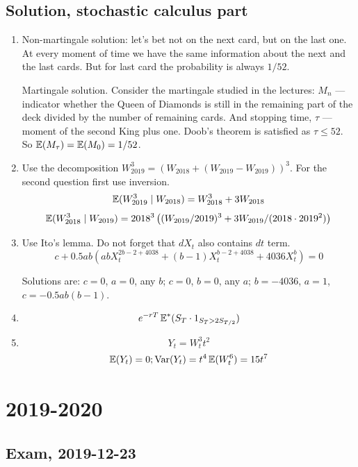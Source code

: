 \documentclass[12pt, a4paper]{article}
\begin{document}
\subsection{Solution, stochastic calculus part}

\begin{enumerate}
\item Non-martingale solution: let's bet not on the next card, but on the last one.
At every moment of time we have the same information about
the next and the last cards. But for last card the probability is always $1/52$.

Martingale solution. Consider the martingale studied in the lectures:
$M_n$ — indicator whether the Queen of Diamonds is still
in the remaining part of the deck divided
by the number of remaining cards.
And stopping time, $\tau$ — moment of the second King plus one.
Doob's theorem is satisfied as $\tau \leq 52$. So $\operatorname{\mathbb{E}}(M_{\tau}) = \operatorname{\mathbb{E}}(M_0)=1/52$.
\item Use the decomposition $W_{2019}^3= (W_{2018} + (W_{2019} - W_{2019}))^3$.
For the second question first use inversion.
\[
\operatorname{\mathbb{E}}(W_{2019}^3 \mid W_{2018}) = W_{2018}^3 + 3W_{2018}
\]
\[
\operatorname{\mathbb{E}}(W_{2018}^3 \mid W_{2019}) = 2018^3 \left( (W_{2019}/2019)^3 + 3 W_{2019}/(2018\cdot 2019^2) \right)
\]

\item Use Ito's lemma. Do not forget that $dX_t$ also contains $dt$ term.
\[
c + 0.5ab(ab X_t^{2b-2+4038} + (b-1)X_t^{b-2+4038} + 4036X_t^b) = 0
\]

Solutions are: $c=0$, $a=0$, any $b$; $c=0$, $b=0$, any $a$; $b=-4036$, $a=1$, $c=-0.5ab(b-1)$.
\item
\[
e^{-rT}\operatorname{\mathbb{E}}^*(S_T \cdot 1_{S_T > 2S_{T/2}})
\]
\item
\[
Y_t = W_t^3 t^2
\]
\[
\operatorname{\mathbb{E}}(Y_t)=0; \operatorname{Var}(Y_t) = t^4 \operatorname{\mathbb{E}}(W_t^6) = 15 t^7
\]
\end{enumerate}


\section{2019-2020}


\subsection{Exam, 2019-12-23}
\end{document}
